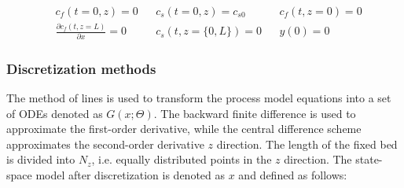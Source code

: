 \documentclass[a4paper,fleqn]{cas-dc}
\begin{document}
		{\footnotesize
			\begin{align*}
				&c_f(t = 0, z) = 0 && c_s(t = 0, z) = c_{s0} && {c_f}(t, z=0) = 0 \\
				&\frac{\partial c_f(t,z=L)}{\partial x} = 0 && c_s(t, z=\{0,L\}) = 0 && y(0) = 0
		\end{align*} }
		
		\subsubsection{Discretization methods}
		
		The method of lines is used to transform the process model equations into a set of ODEs denoted as $G(x;\Theta)$. The backward finite difference is used to approximate the first-order derivative, while the central difference scheme approximates the second-order derivative $z$ direction. The length of the fixed bed is divided into $N_z$, i.e. equally distributed points in the $z$ direction. The state-space model after discretization is denoted as $x$ and defined as follows:
		
\end{document}
